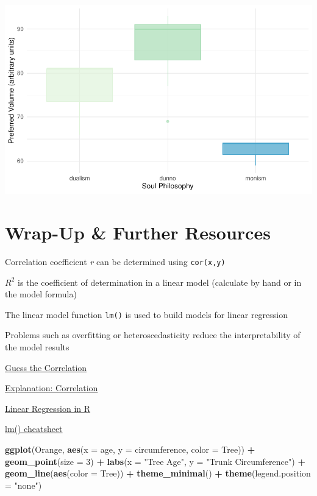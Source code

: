 \documentclass[
]{book}
\newenvironment{Shaded}{\begin{snugshade}}{\end{snugshade}}
\newcommand{\AttributeTok}[1]{\textcolor[rgb]{0.13,0.29,0.53}{#1}}
\newcommand{\DecValTok}[1]{\textcolor[rgb]{0.00,0.00,0.81}{#1}}
\newcommand{\FunctionTok}[1]{\textcolor[rgb]{0.13,0.29,0.53}{\textbf{#1}}}
\newcommand{\NormalTok}[1]{#1}
\newcommand{\SpecialCharTok}[1]{\textcolor[rgb]{0.81,0.36,0.00}{\textbf{#1}}}
\newcommand{\StringTok}[1]{\textcolor[rgb]{0.31,0.60,0.02}{#1}}
\begin{document}
\includegraphics{_main_files/figure-latex/unnamed-chunk-89-1.pdf}

\section{Wrap-Up \& Further Resources}\label{wrap-up-further-resources-7}

Correlation coefficient \emph{r} can be determined using \texttt{cor(x,y)}

\(R^2\) is the coefficient of determination in a linear model (calculate by hand or in the model formula)

The linear model function \texttt{lm()} is used to build models for linear regression

Problems such as overfitting or heteroscedasticity reduce the interpretability of the model results

\href{https://www.guessthecorrelation.com/}{Guess the Correlation}

\href{https://statisticsbyjim.com/basics/correlation-coefficient-formula/}{Explanation: Correlation}

\href{https://www.datacamp.com/tutorial/linear-regression-R}{Linear Regression in R}

\href{https://www.codecademy.com/learn/learn-linear-regression-in-r/modules/linear-regression-in-r/cheatsheet/}{lm() cheatsheet}

\begin{Shaded}
\begin{Highlighting}[]
\FunctionTok{ggplot}\NormalTok{(Orange, }\FunctionTok{aes}\NormalTok{(}\AttributeTok{x =}\NormalTok{ age, }\AttributeTok{y =}\NormalTok{ circumference, }\AttributeTok{color =}\NormalTok{ Tree)) }\SpecialCharTok{+}
  \FunctionTok{geom\_point}\NormalTok{(}\AttributeTok{size =} \DecValTok{3}\NormalTok{) }\SpecialCharTok{+} \FunctionTok{labs}\NormalTok{(}\AttributeTok{x =} \StringTok{"Tree Age"}\NormalTok{, }\AttributeTok{y =} \StringTok{"Trunk Circumference"}\NormalTok{) }\SpecialCharTok{+}
  \FunctionTok{geom\_line}\NormalTok{(}\FunctionTok{aes}\NormalTok{(}\AttributeTok{color =}\NormalTok{ Tree)) }\SpecialCharTok{+} \FunctionTok{theme\_minimal}\NormalTok{() }\SpecialCharTok{+} \FunctionTok{theme}\NormalTok{(}\AttributeTok{legend.position =} \StringTok{"none"}\NormalTok{)}
\end{Highlighting}
\end{Shaded}
\end{document}
